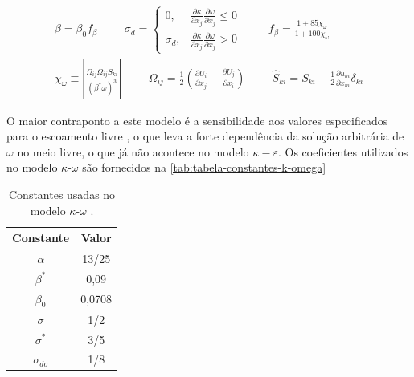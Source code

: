 \begin{equation}
\begin{aligned}
	\beta = \beta_{0}f_{\beta} 
	\hspace{1cm}
	\sigma_{d} =
	\begin{cases}
		0, &	\frac{\partial\kappa}{\partial x_j	}\frac{\partial \omega}{\partial x_j} \leq 0 \\
		\sigma_d, & \frac{\partial\kappa}{\partial x_j	}\frac{\partial \omega}{\partial x_j} > 0
	\end{cases}
	\hspace{1cm}
	f_{\beta} = \frac{1 + 85\chi_{\omega}}{1 + 100\chi_{\omega}} \\
	\chi_{\omega} \equiv \left|\frac{\Omega_{ij}\Omega_{ij}\hat{S}_{ki}}{(\beta^{*}\omega)^3}\right|
	\hspace{1cm}
	\Omega_{ij} = \frac{1}{2}\left(\frac{\partial U_i}{\partial x_j} - \frac{\partial U_j}{\partial x_i}\right)
	\hspace{1cm}
	\hat{S}_{ki} = S_{ki} - \frac{1}{2}\frac{\partial u_m}{\partial x_m}\delta_{ki}
\end{aligned}
\end{equation}

O maior contraponto a este modelo é a sensibilidade aos valores especificados para o escoamento livre \cite{Menter1992}, o que leva a forte dependência da solução arbitrária de $\omega$ no meio livre, o que já não acontece no modelo $\kappa-\varepsilon$. Os coeficientes utilizados no modelo $\kappa$-$\omega$ são fornecidos na \autoref{tab:tabela-constantes-k-omega}

\begin{table}[ht]
\centering
\caption[Constantes usadas no modelo $\kappa$-$\omega$.]{Constantes usadas no modelo $\kappa$-$\omega$ \cite{Wilcox1988ReassessmentOT,Wilcox2006,Wilcox2008}.}
\vspace{0.5cm}
\begin{tabular}{c|c}
 
Constante & Valor \\
\hline
$\alpha$ & 13/25 \\
$\beta^*$ & 0,09 \\
$\beta_{0}$ & 0,0708 \\
$\sigma$ & 1/2 \\
$\sigma^*$ & 3/5 \\
$\sigma_{do}$ & 1/8

\end{tabular}
\label{tab:tabela-constantes-k-omega}
\end{table}


